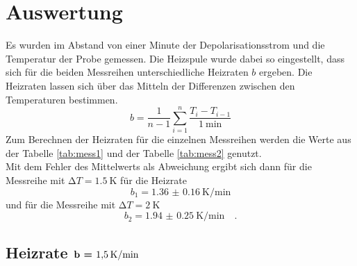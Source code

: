 \newpage 
\section{Auswertung}

\noindent Es wurden im Abstand von einer Minute der Depolarisationsstrom und die Temperatur der Probe gemessen.
Die Heizspule wurde dabei so eingestellt, dass sich für die beiden Messreihen unterschiedliche Heizraten $b$ ergeben.
Die Heizraten lassen sich über das Mitteln der Differenzen zwischen den Temperaturen bestimmen.\\
\begin{equation*}
  b = \frac{1}{n-1} \sum_{i=1}^{n} \frac{T_i - T_{i-1}}{\SI{1}{\minute}}
\end{equation*}
Zum Berechnen der Heizraten für die einzelnen Messreihen werden die Werte aus der Tabelle \ref{tab:mess1} und der Tabelle \ref{tab:mess2} genutzt.\\
Mit dem Fehler des Mittelwerts als Abweichung ergibt sich dann für die Messreihe mit $\increment T = \SI{1.5}{\kelvin}$ für die Heizrate
\begin{equation*}
  b_1 = \SI{1.36(016)}{\kelvin\per\minute}
\end{equation*}
und für die Messreihe mit $\increment T = \SI{2}{\kelvin}$ 
\begin{equation*}
  b_2 = \SI{1.94(025)}{\kelvin\per\minute} \quad .
\end{equation*}

\subsection{Heizrate $\textbf{b = \SI{1.5}{\kelvin\per\minute}}$}
\label{sec:15}

